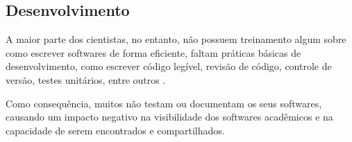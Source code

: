%
%
%

\subsection{Desenvolvimento}

A maior parte dos cientistas, no entanto, não possuem treinamento algum sobre
como escrever softwares de forma eficiente, faltam práticas básicas de
desenvolvimento, como escrever código legível, revisão de código, controle de
versão, testes unitários, entre outros \cite{wilson2017good}.

%

Como consequência, muitos não testam ou documentam os seus softwares, causando
um impacto negativo na visibilidade dos softwares acadêmicos \cite{howison2013,
katz2014transitive} e na capacidade de serem encontrados e compartilhados.


